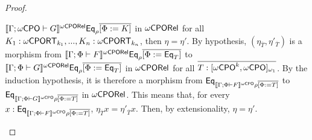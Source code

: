 \documentclass[acmsmall,review,anonymous]{acmart}
\theoremstyle{definition}
\begin{document}
\begin{proof}
\begin{itemize}
$\llbracket{\Gamma ; {\omega\mathsf{CPO}}\vdash G}\rrbracket^{{\omega\mathsf{CPORel}}} \mathsf{Eq}_{\rho}\overline{[\Phi := K]}$
in ${\omega\mathsf{CPORel}}$ for all $K_1 : {\omega\mathsf{CPORT}}_{k_1},...,K_n : {\omega\mathsf{CPORT}}_{k_n}$,
then $\eta = \eta'$. By hypothesis, $(\eta_{\overline{T}},
\eta'_{\overline{T}})$ is a morphism from $\llbracket{\Gamma; \Phi
  \vdash F}\rrbracket^{{\omega\mathsf{CPORel}}} \mathsf{Eq}_{\rho}\overline{[\Phi := \mathsf{Eq}_{T}]}$ to
$\llbracket{\Gamma ; \Phi \vdash G}\rrbracket^{{\omega\mathsf{CPORel}}} \mathsf{Eq}_{\rho}\overline{[\Phi :=
    \mathsf{Eq}_{T}]}$ in ${\omega\mathsf{CPORel}}$ for all $\overline{T :
  [{\omega\mathsf{CPO}}^k,{\omega\mathsf{CPO}}]_{\omega_1}}$.  By the induction hypothesis, it is
therefore a morphism from $\mathsf{Eq}_{\llbracket{\Gamma; \Phi \vdash F}\rrbracket^{{\omega\mathsf{CPO}}}
  \rho\overline{[\Phi := T]}}$ to $\mathsf{Eq}_{\llbracket{\Gamma; \Phi \vdash
    G}\rrbracket^{{\omega\mathsf{CPO}}} \rho\overline{[\Phi := T]}}$ in ${\omega\mathsf{CPORel}}$. This means that, for
every $x : \mathsf{Eq}_{\llbracket{\Gamma; \Phi \vdash F}\rrbracket^{{\omega\mathsf{CPO}}} \rho\overline{[\Phi :=
      T]}}$, $\eta_{\overline{T}}x = \eta'_{\overline{T}}x$.  Then, by
extensionality, $\eta = \eta'$.


\end{itemize}
\end{proof}
\end{document}
